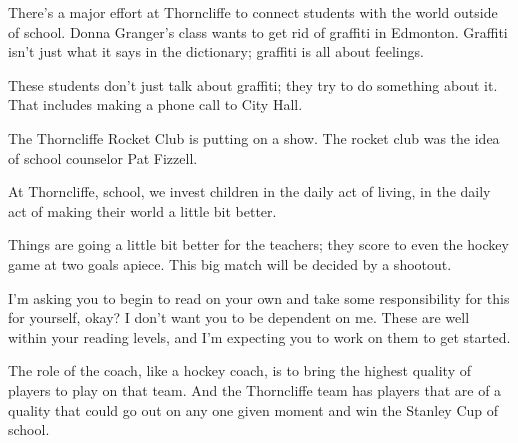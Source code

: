 There's a major effort at Thorncliffe to connect students with the world outside of school. Donna Granger's class wants to get rid of graffiti in Edmonton. Graffiti isn't just what it says in the dictionary; graffiti is all about feelings.

These students don't just talk about graffiti; they try to do something about it. That includes making a phone call to City Hall.

The Thorncliffe Rocket Club is putting on a show. The rocket club was the idea of school counselor Pat Fizzell.

At Thorncliffe, school, we invest children in the daily act of living, in the daily act of making their world a little bit better.

Things are going a little bit better for the teachers; they score to even the hockey game at two goals apiece. This big match will be decided by a shootout.

I'm asking you to begin to read on your own and take some responsibility for this for yourself, okay? I don't want you to be dependent on me. These are well within your reading levels, and I'm expecting you to work on them to get started.

The role of the coach, like a hockey coach, is to bring the highest quality of players to play on that team. And the Thorncliffe team has players that are of a quality that could go out on any one given moment and win the Stanley Cup of school.